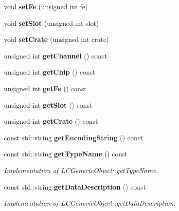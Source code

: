 \begin{DoxyCompactItemize}
\item 
void {\bfseries setFe} (unsigned int fe)\label{classCALICE_1_1DAQconnection_abbdb39c30e0d4c1709dc016fabbefabf}

\item 
void {\bfseries setSlot} (unsigned int slot)\label{classCALICE_1_1DAQconnection_a63a06aa5dda5881a3f19135cd5e42bf5}

\item 
void {\bfseries setCrate} (unsigned int crate)\label{classCALICE_1_1DAQconnection_aab13f456fa1e0f793b09820c82d9ada9}

\item 
unsigned int {\bfseries getChannel} () const \label{classCALICE_1_1DAQconnection_a5578725f9868a3c581425eca90fdd223}

\item 
unsigned int {\bfseries getChip} () const \label{classCALICE_1_1DAQconnection_a4a783e2a4d37608d087479dc255731d2}

\item 
unsigned int {\bfseries getFe} () const \label{classCALICE_1_1DAQconnection_ace1feda8e13487780aff0666eaadc83c}

\item 
unsigned int {\bfseries getSlot} () const \label{classCALICE_1_1DAQconnection_af873791c5318dc6496f96c16d1b782a7}

\item 
unsigned int {\bfseries getCrate} () const \label{classCALICE_1_1DAQconnection_a6379ea8cfc3e76ab748acae97e25553b}

\item 
const std::string {\bfseries getEncodingString} () const \label{classCALICE_1_1DAQconnection_aa1ccbcccb16b3ff6ace4b0e31c1d87ff}

\item 
const std::string {\bf getTypeName} () const \label{classCALICE_1_1DAQconnection_a25b1407516b5afd73f813662de211d7e}

\begin{DoxyCompactList}\small\item\em Implementation of LCGenericObject::getTypeName. \item\end{DoxyCompactList}\item 
const std::string {\bf getDataDescription} () const \label{classCALICE_1_1DAQconnection_a7b2b9484febf8612c71291028c6675f4}

\begin{DoxyCompactList}\small\item\em Implementation of LCGenericObject::getDataDescription. \item\end{DoxyCompactList}\end{DoxyCompactItemize}
